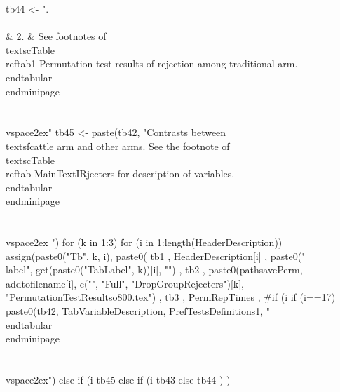 \begin{Schunk}
\begin{Sinput}
tb44 <- ".\\\\& 2. &  See footnotes of \\textsc{Table \\ref{tab1 Permutation test results of rejection among traditional arm}}. \\end{tabular}\\end{minipage}\\\\\\vspace{2ex}"
tb45 <- paste(tb42, "Contrasts between \\textsf{cattle} arm and other arms. See the footnote of \\textsc{Table \\ref{tab MainTextIRjecters}} for description of variables. \\end{tabular}\\end{minipage}\\\\\\vspace{2ex} ")
for (k in 1:3) 
  for (i in 1:length(HeaderDescription))
    assign(paste0("Tb", k, i), 
      paste0(
        tb1
        , 
        HeaderDescription[i]
        ,
        paste0("\\label{", get(paste0("TabLabel", k))[i], "}")
        ,
        tb2
        , 
        paste0(pathsavePerm, addtofilename[i], c("", "Full", "DropGroupRejecters")[k],
          "PermutationTestResultso800.tex")
        , 
        tb3
        ,
        PermRepTimes
        ,
        #if (i %
        if (i==17) 
          paste0(tb42, TabVariableDescription, PrefTestsDefinitions1, "\\end{tabular}\\end{minipage}\\\\\\vspace{2ex}") else 
        if (i %
          tb45 else 
        if (i %
          tb43 else 
          tb44
        )
      )
\end{Sinput}
\end{Schunk}

